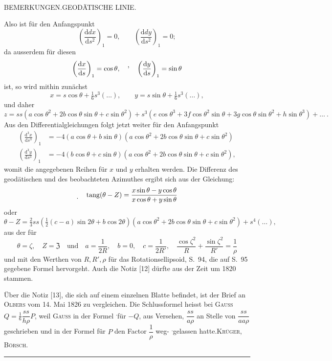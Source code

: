 \clearpage
{}\hfill BEMERKUNGEN.\quad GEODÄTISCHE LINIE.\hfill\mbox{}\par
{\small
\noindent Also ist für den Anfangspunkt
\[
\left(\frac{\mathrm ddx}{\mathrm ds^2}\right)_1=0,\qquad\left(\frac{\mathrm ddy}{\mathrm ds^2}\right)_1=0;
\]
da ausserdem für diesen
\[
\left(\frac{\mathrm dx}{\mathrm ds}\right)_1=\cos\theta,\quad\text{\raisebox{1.2ex}{,}}\quad\left(\frac{\mathrm dy}{\mathrm ds}\right)_1=\sin\theta
\]
ist, so wird mithin zunächst
\[
x=s\cos\theta+\tfrac16s^3(\ldots),\qquad y=s\sin\theta+\tfrac16s^3(\ldots),
\]
und daher
\[
z=ss(a\cos\theta^2+2b\cos\theta\sin\theta+c\sin\theta^2)+s^3(e\cos\theta^3+3f\cos\theta^2\sin\theta+3g\cos\theta\sin\theta^2+h\sin\theta^3)+\ldots\ .
\]
Aus den Differentialgleichungen folgt jetzt weiter für den Anfangspunkt
\[
\begin{aligned}
\left(\frac{\mathrm d^3x}{\mathrm ds^3}\right)_1&=-4(a\cos\theta+b\sin\theta)(a\cos\theta^2+2b\cos\theta\sin\theta+c\sin\theta^2)\\
\left(\frac{\mathrm d^3y}{\mathrm ds^3}\right)_1&=-4(b\cos\theta+c\sin\theta)(a\cos\theta^2+2b\cos\theta\sin\theta+c\sin\theta^2),
\end{aligned}
\]
womit die angegebenen Reihen für $x$ und $y$ erhalten werden. Die Differenz des geodätischen und des beobachteten Azimuthes ergibt sich aus der Gleichung:
\[
\text{\raisebox{-.6ex}{.}}\quad\operatorname{tang}(\theta-Z)=\frac{x\sin\theta-y\cos\theta}{x\cos\theta+y\sin\theta}
\]
oder
\[
\theta-Z=\tfrac23ss(\tfrac12(c-a)\sin2\theta+b\cos2\theta)(a\cos\theta^2+2b\cos\theta\sin\theta+c\sin\theta^2)+s^4(\ldots),
\]
aus der für
\[
\theta=\zeta,\quad Z=\mathfrak Z\quad\text{und}\quad a=\frac1{2R},\quad b=0,\quad c=\frac1{2R'},\quad\frac{\cos\zeta^2}{R}+\frac{\sin\zeta^2}{R'}=\frac1\rho
\]
und mit den Werthen von $R,R',\rho$ für das Rotationsellipsoid, S.\ 94, die auf S.\ 95 gegebene Formel hervorgeht. Auch die Notiz [12] dürfte aus der Zeit um 1820 stammen.

Über die Notiz [13], die sich auf einem einzelnen Blatte befindet, ist der Brief an \textsc{Olbers} vom 14. Mai 1826 zu vergleichen. Die Schlussformel heisst bei \textsc{Gauss} $Q=\tfrac16\dfrac{ss}{h\rho}P$, weil \textsc{Gauss} in der Formel \textsuperscript{.}für $-Q$, aus Versehen, $\dfrac{ss}{a\rho}$ an Stelle von $\dfrac{ss}{aa\rho}$ geschrieben und in der Formel für $P$ den Factor $\dfrac1\rho$ weg-\linebreak
\textsuperscript{.}gelassen hatte.\hfill\textsc{Krüger, Börsch.}\par
}
\begin{center}\rule{.24\textwidth}{.4pt}\end{center}

